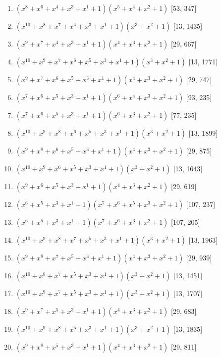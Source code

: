 \documentclass[10pt,twocolumn]{article}
\begin{document}
\begin{enumerate}
\item $(x^{8} + x^{6} + x^{4} + x^{3} + x^{1} + 1)(x^{5} + x^{4} + x^{2} + 1)$  [53, 347]
\item $(x^{10} + x^{8} + x^{7} + x^{4} + x^{3} + x^{1} + 1)(x^{3} + x^{2} + 1)$  [13, 1435]
\item $(x^{9} + x^{7} + x^{4} + x^{3} + x^{1} + 1)(x^{4} + x^{3} + x^{2} + 1)$  [29, 667]
\item $(x^{10} + x^{9} + x^{7} + x^{6} + x^{5} + x^{3} + x^{1} + 1)(x^{3} + x^{2} + 1)$  [13, 1771]
\item $(x^{9} + x^{7} + x^{6} + x^{5} + x^{3} + x^{1} + 1)(x^{4} + x^{3} + x^{2} + 1)$  [29, 747]
\item $(x^{7} + x^{6} + x^{5} + x^{3} + x^{1} + 1)(x^{6} + x^{4} + x^{3} + x^{2} + 1)$  [93, 235]
\item $(x^{7} + x^{6} + x^{5} + x^{3} + x^{1} + 1)(x^{6} + x^{3} + x^{2} + 1)$  [77, 235]
\item $(x^{10} + x^{9} + x^{8} + x^{6} + x^{5} + x^{3} + x^{1} + 1)(x^{3} + x^{2} + 1)$  [13, 1899]
\item $(x^{9} + x^{8} + x^{6} + x^{5} + x^{3} + x^{1} + 1)(x^{4} + x^{3} + x^{2} + 1)$  [29, 875]
\item $(x^{10} + x^{9} + x^{6} + x^{5} + x^{3} + x^{1} + 1)(x^{3} + x^{2} + 1)$  [13, 1643]
\item $(x^{9} + x^{6} + x^{5} + x^{3} + x^{1} + 1)(x^{4} + x^{3} + x^{2} + 1)$  [29, 619]
\item $(x^{6} + x^{5} + x^{3} + x^{1} + 1)(x^{7} + x^{6} + x^{5} + x^{3} + x^{2} + 1)$  [107, 237]
\item $(x^{6} + x^{5} + x^{3} + x^{1} + 1)(x^{7} + x^{6} + x^{3} + x^{2} + 1)$  [107, 205]
\item $(x^{10} + x^{9} + x^{8} + x^{7} + x^{5} + x^{3} + x^{1} + 1)(x^{3} + x^{2} + 1)$  [13, 1963]
\item $(x^{9} + x^{8} + x^{7} + x^{5} + x^{3} + x^{1} + 1)(x^{4} + x^{3} + x^{2} + 1)$  [29, 939]
\item $(x^{10} + x^{8} + x^{7} + x^{5} + x^{3} + x^{1} + 1)(x^{3} + x^{2} + 1)$  [13, 1451]
\item $(x^{10} + x^{9} + x^{7} + x^{5} + x^{3} + x^{1} + 1)(x^{3} + x^{2} + 1)$  [13, 1707]
\item $(x^{9} + x^{7} + x^{5} + x^{3} + x^{1} + 1)(x^{4} + x^{3} + x^{2} + 1)$  [29, 683]
\item $(x^{10} + x^{9} + x^{8} + x^{5} + x^{3} + x^{1} + 1)(x^{3} + x^{2} + 1)$  [13, 1835]
\item $(x^{9} + x^{8} + x^{5} + x^{3} + x^{1} + 1)(x^{4} + x^{3} + x^{2} + 1)$  [29, 811]

\end{enumerate}
\end{document}
